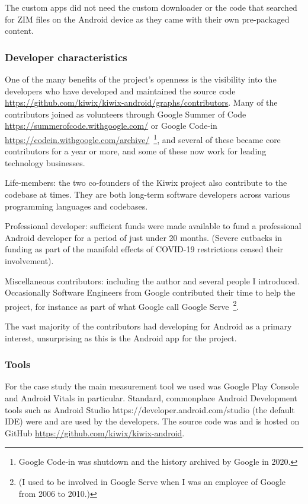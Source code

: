 The custom apps did not need the custom downloader or the code that searched for ZIM files on the Android device as they came with their own pre-packaged content.


\subsubsection{Developer characteristics}
One of the many benefits of the project’s openness is the visibility into the developers who have developed and maintained the source code \url{https://github.com/kiwix/kiwix-android/graphs/contributors}. Many of the contributors joined as volunteers through Google Summer of Code \url{https://summerofcode.withgoogle.com/} or Google Code-in \url{https://codein.withgoogle.com/archive/}~\footnote{Google Code-in was shutdown and the history archived by Google in 2020.}, and several of these became core contributors for a year or more, and some of these now work for leading technology businesses. 

Life-members: the two co-founders of the Kiwix project also contribute to the codebase at times. They are both long-term software developers across various programming languages and codebases.

Professional developer: sufficient funds were made available to fund a professional Android developer for a period of just under 20 months. (Severe cutbacks in funding as part of the manifold effects of COVID-19 restrictions ceased their involvement).

Miscellaneous contributors: including the author and several people I introduced. Occasionally Software Engineers from Google contributed their time to help the project, for instance as part of what Google call Google Serve~\footnote{(I used to be involved in Google Serve when I was an employee of Google from 2006 to 2010.)}.

The vast majority of the contributors had developing for Android as a primary interest, unsurprising as this is the Android app for the project.

\subsubsection{Tools}
For the case study the main measurement tool we used was Google Play Console and Android Vitals in particular. Standard, commonplace Android Development tools such as Android Studio https://developer.android.com/studio (the default IDE) were and are used by the developers. The source code was and is hosted on GitHub \url{https://github.com/kiwix/kiwix-android}.

